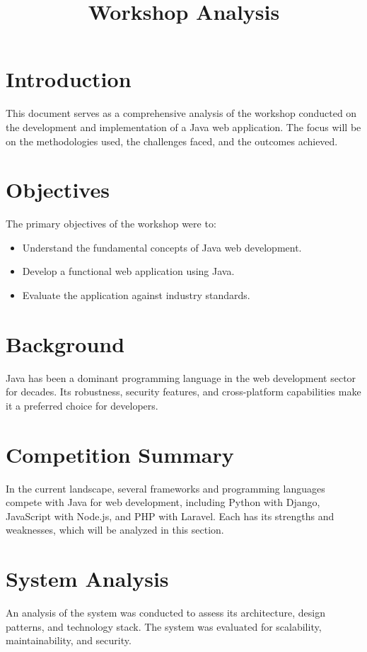 \documentclass{article}
\title{Workshop Analysis}
\author{}
\date{}
\begin{document}
\maketitle

\section{Introduction}
This document serves as a comprehensive analysis of the workshop conducted on the development and implementation of a Java web application. The focus will be on the methodologies used, the challenges faced, and the outcomes achieved.

\section{Objectives}
The primary objectives of the workshop were to:
\begin{itemize}
    \item Understand the fundamental concepts of Java web development.
    \item Develop a functional web application using Java.
    \item Evaluate the application against industry standards.
\end{itemize}

\section{Background}
Java has been a dominant programming language in the web development sector for decades. Its robustness, security features, and cross-platform capabilities make it a preferred choice for developers.

\section{Competition Summary}
In the current landscape, several frameworks and programming languages compete with Java for web development, including Python with Django, JavaScript with Node.js, and PHP with Laravel. Each has its strengths and weaknesses, which will be analyzed in this section.

\section{System Analysis}
An analysis of the system was conducted to assess its architecture, design patterns, and technology stack. The system was evaluated for scalability, maintainability, and security.
\end{document}
